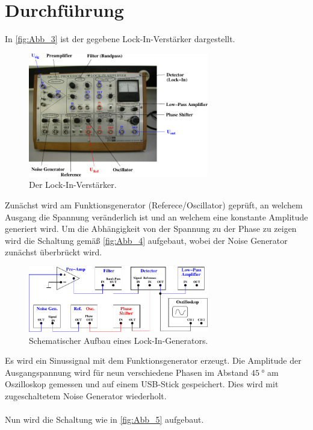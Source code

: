 \section{Durchführung}
\label{sec:Durchführung}

In \autoref{fig:Abb_3} ist der gegebene Lock-In-Verstärker dargestellt.
\begin{figure}[H]
    \centering
    \includegraphics[width=0.7\textwidth]{build/Abb_3.pdf}
    \caption {Der Lock-In-Verstärker.\cite{V303}}
    \label{fig:Abb_3}
\end{figure}
Zunächst wird am Funktionsgenerator (Referece/Oscillator) geprüft, an welchem Ausgang die Spannung veränderlich ist und an welchem eine konstante Amplitude generiert wird.
Um die Abhängigkeit von der Spannung zu der Phase zu zeigen wird die Schaltung gemäß \autoref{fig:Abb_4} aufgebaut, wobei der Noise Generator zunächst überbrückt wird.
\begin{figure}[H]
    \centering
    \includegraphics[width=0.7\textwidth]{build/Abb_4.pdf}
    \caption {Schematischer Aufbau eines Lock-In-Generators.\cite{V303}}
    \label{fig:Abb_4}
\end{figure}
Es wird ein Sinussignal mit dem Funktionsgenerator erzeugt.
Die Amplitude der Ausgangspannung wird für neun verschiedene Phasen im Abstand $\qty{45}{\degree}$ am Oszilloskop gemessen und auf einem USB-Stick gespeichert.
Dies wird mit zugeschaltetem Noise Generator wiederholt.\\
\\
Nun wird die Schaltung wie in \autoref{fig:Abb_5} aufgebaut.
